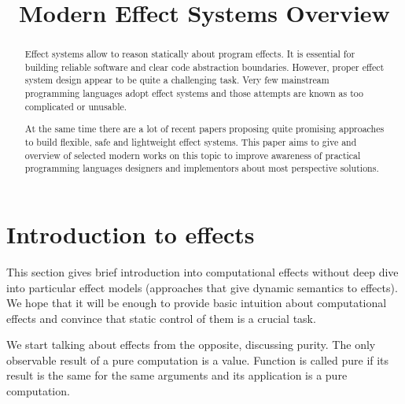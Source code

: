 \documentclass[conference]{IEEEtran}
\begin{document}
    \title{Modern Effect Systems Overview
    }

    \author{
    }

    \maketitle


    \begin{abstract}
        Effect systems allow to reason statically about program effects.
        It is essential for building reliable software and clear code abstraction boundaries.
        However, proper effect system design appear to be quite a challenging task.
        Very few mainstream programming languages adopt effect systems and those attempts are known as too complicated or unusable.

        At the same time there are a lot of recent papers proposing quite promising approaches to build flexible, safe and lightweight effect systems.
        This paper aims to give and overview of selected modern works on this topic to improve awareness of practical programming languages designers and implementors about most perspective solutions.
    \end{abstract}


    \section{Introduction to effects}

    This section gives brief introduction into computational effects without deep dive into particular effect models (approaches that give dynamic semantics to effects).
    We hope that it will be enough to provide basic intuition about computational effects and convince that static control of them is a crucial task.

    We start talking about effects from the opposite, discussing purity.
    The only observable result of a pure computation is a value.
    Function is called pure if its result is the same for the same arguments and its application is a pure computation.
\end{document}
